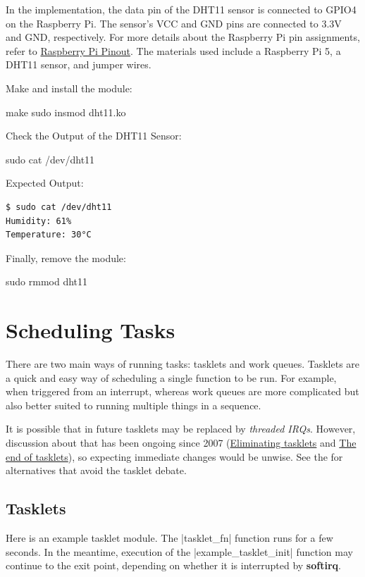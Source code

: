 \documentclass[10pt, oneside]{book}
\begin{document}
In the implementation, the data pin of the DHT11 sensor is connected to GPIO4 on the Raspberry Pi.
The sensor's VCC and GND pins are connected to 3.3V and GND, respectively.
For more details about the Raspberry Pi pin assignments, refer to \href{https://pinout.xyz/}{Raspberry Pi Pinout}.
The materials used include a Raspberry Pi 5, a DHT11 sensor, and jumper wires.

Make and install the module:
\begin{codebash}
make
sudo insmod dht11.ko
\end{codebash}

Check the Output of the DHT11 Sensor:
\begin{codebash}
sudo cat /dev/dht11
\end{codebash}

Expected Output:
\begin{verbatim}
$ sudo cat /dev/dht11
Humidity: 61%
Temperature: 30°C
\end{verbatim}

Finally, remove the module:
\begin{codebash}
sudo rmmod dht11
\end{codebash}

\section{Scheduling Tasks}
\label{sec:scheduling_tasks}
There are two main ways of running tasks: tasklets and work queues.
Tasklets are a quick and easy way of scheduling a single function to be run.
For example, when triggered from an interrupt,
whereas work queues are more complicated but also better suited to running multiple things in a sequence.

It is possible that in future tasklets may be replaced by \textit{threaded IRQs}.
However, discussion about that has been ongoing since 2007 (\href{https://lwn.net/Articles/239633}{Eliminating tasklets} and \href{https://lwn.net/Articles/960041/}{The end of tasklets}),
so expecting immediate changes would be unwise.
See the  for alternatives that avoid the tasklet debate.

\subsection{Tasklets}
\label{sec:tasklet}
Here is an example tasklet module.
The \cpp|tasklet_fn| function runs for a few seconds.
In the meantime, execution of the \cpp|example_tasklet_init| function may continue to the exit point,
depending on whether it is interrupted by \textbf{softirq}.
\end{document}
